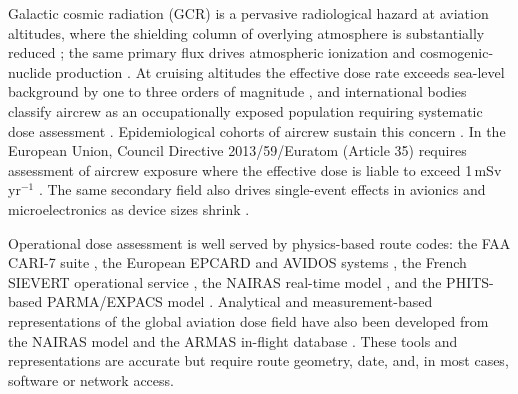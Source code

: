 \documentclass[11pt,a4paper]{article}
\begin{document}
Galactic cosmic radiation (GCR) is a pervasive radiological hazard at
aviation altitudes, where the shielding column of overlying atmosphere is
substantially reduced \citep{obrien1997atmospheric,icrp2007}; the same
primary flux drives atmospheric ionization and cosmogenic-nuclide
production \citep{makrantoni2022,environ}. At cruising altitudes the
effective dose rate exceeds sea-level background by one to three orders of
magnitude \citep{pelliccioni2000,ferrari1997,lindborg2004}, and
international bodies classify aircrew as an occupationally exposed
population requiring systematic dose assessment
\citep{icrp2007,icrp1991,icrp132}. Epidemiological cohorts of aircrew
sustain this concern \citep{hammer2009,grajewski2011,dreger2020}. In the
European Union, Council Directive 2013/59/Euratom (Article 35) requires
assessment of aircrew exposure where the effective dose is liable to exceed
1\,mSv\,yr$^{-1}$ \citep{eudirective2013}. The same secondary field also
drives single-event effects in avionics and microelectronics as device
sizes shrink \citep{normand1996,dyerqinetiq2007}.

Operational dose assessment is well served by physics-based route codes:
the FAA CARI-7 suite \citep{anic2016,copeland2008}, the European EPCARD and
AVIDOS systems \citep{latocha2016}, the French SIEVERT operational service
\citep{sievert,clairand2009sievert,bottollier2006}, the NAIRAS real-time
model \citep{mertens2013}, and the PHITS-based PARMA/EXPACS model
\citep{sato2015parma}. Analytical and measurement-based representations of
the global aviation dose field have also been developed from the NAIRAS
model and the ARMAS in-flight database
\citep{tobiska2018,meier2018,meier2014swindex,phoenix2026}. These tools and
representations are accurate but require route geometry, date, and, in most
cases, software or network access.
\end{document}
